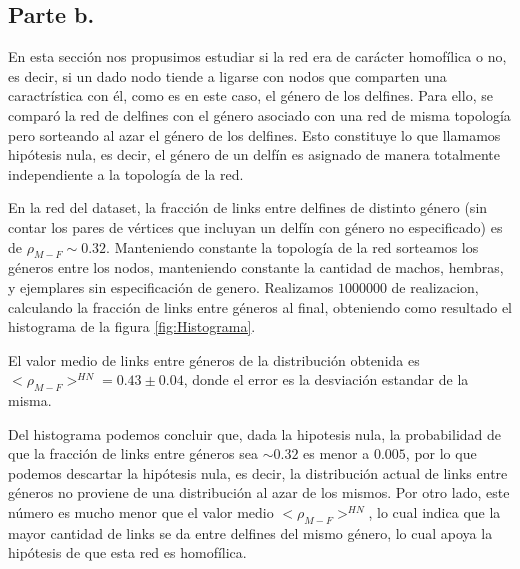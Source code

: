 \subsection{Parte b.}

\par En esta sección nos propusimos estudiar si la red era de carácter homofílica o no, es decir, si un dado nodo tiende a ligarse con nodos que comparten una caractrística con él, como es en este caso, el género de los delfines.
Para ello, se comparó la red de delfines con el género asociado con una red de misma topología pero sorteando al azar el género de los delfines. Esto constituye lo que llamamos hipótesis nula, es decir, el género de un delfín es asignado de manera totalmente independiente a la topología de la red.
\par En la red del dataset, la fracción de links entre delfines de distinto género (sin contar los pares de vértices que incluyan un delfín con género no especificado) es de $\rho_{M-F} \sim 0.32$. Manteniendo constante la topología de la red sorteamos los géneros entre los nodos, manteniendo constante la cantidad de machos, hembras, y ejemplares sin especificación de genero. Realizamos $1000000$ de realizacion, calculando la fracción de links entre géneros al final, obteniendo como resultado el histograma de la figura \ref{fig:Histograma}.
\par El valor medio de links entre géneros de la distribución obtenida es $<\rho_{M-F}>^{HN} = 0.43 \pm 0.04$, donde el error es la desviación estandar de la misma.
\par Del histograma podemos concluir que, dada la hipotesis nula, la probabilidad de que la fracción de links entre géneros sea $\sim 0.32$ es menor a $0.005$, por lo que podemos descartar la hipótesis nula, es decir, la distribución actual de links entre géneros no proviene de una distribución al azar de los mismos. Por otro lado, este número es mucho menor que el valor medio $<\rho_{M-F}>^{HN}$, lo cual indica que la mayor cantidad de links se da entre delfines del mismo género, lo cual apoya la hipótesis de que esta red es homofílica.

